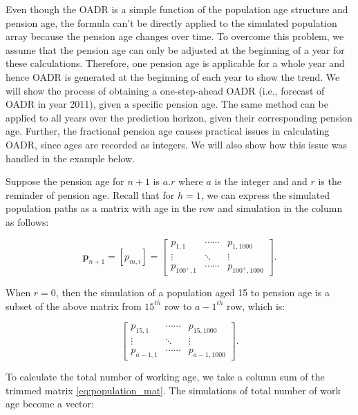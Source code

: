\documentclass[11pt,a4paper,]{article}
\begin{document}
Even though the OADR is a simple function of the population age
structure and pension age, the formula can't be directly applied to the
simulated population array because the pension age changes over time. To
overcome this problem, we assume that the pension age can only be
adjusted at the beginning of a year for these calculations. Therefore,
one pension age is applicable for a whole year and hence OADR is
generated at the beginning of each year to show the trend. We will show
the process of obtaining a one-step-ahead OADR (i.e., forecast of OADR
in year 2011), given a specific pension age. The same method can be
applied to all years over the prediction horizon, given their
corresponding pension age. Further, the fractional pension age causes
practical issues in calculating OADR, since ages are recorded as
integers. We will also show how this issue was handled in the example
below.

Suppose the pension age for \(n+1\) is \(a.r\) where \(a\) is the
integer and and \(r\) is the reminder of pension age. Recall that for
\(h=1\), we can express the simulated population paths as a matrix with
age in the row and simulation in the column as follows:

\begin{equation*}
  \bm{p}_{n+1}=[p_{m,i}] =
    \begin{bmatrix}
       p_{1,1} & \cdots\cdots & p_{1,1000} \\
      \vdots & \ddots & \vdots \\
      p_{100^+,1} & \cdots\cdots &p_{100^+,1000}
      \end{bmatrix}.
\end{equation*}

When \(r=0\), then the simulation of a population aged 15 to pension age
is a subset of the above matrix from \(15^{th}\) row to \(a-1^{th}\)
row, which is:

\begin{equation}
  \begin{bmatrix}
    p_{15,1} & \cdots\cdots & p_{15,1000} \\
    \vdots & \ddots & \vdots \\
    p_{a-1,1} & \cdots\cdots &p_{a-1,1000}
  \end{bmatrix}. \label{eq:population_mat}
\end{equation}

To calculate the total number of working age, we take a column sum of
the trimmed matrix \eqref{eq:population_mat}. The simulations of total
number of work age become a vector:
\end{document}
